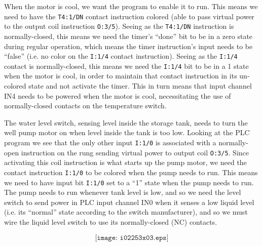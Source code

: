 When the motor is cool, we want the program to enable it to run.  This means we need to have the {\tt T4:1/DN} contact instruction colored (able to pass virtual power to the output coil instruction {\tt O:3/5}).  Seeing as the {\tt T4:1/DN} instruction is normally-closed, this means we need the timer's ``done'' bit to be in a zero state during regular operation, which means the timer instruction's input needs to be ``false'' (i.e. no color on the {\tt I:1/4} contact instruction).  Seeing as the {\tt I:1/4} contact is normally-closed, this means we need the {\tt I:1/4} bit to be in a 1 state when the motor is cool, in order to maintain that contact instruction in its un-colored state and not activate the timer.  This in turn means that input channel IN4 needs to be powered when the motor is cool, necessitating the use of normally-closed contacts on the temperature switch.

\vskip 10pt

The water level switch, sensing level inside the storage tank, needs to turn the well pump motor on when level inside the tank is too low.  Looking at the PLC program we see that the only other input {\tt I:1/0} is associated with a normally-open instruction on the rung sending virtual power to output coil {\tt O:3/5}.  Since activating this coil instruction is what starts up the pump motor, we need the contact instruction {\tt I:1/0} to be colored when the pump needs to run.  This means we need to have input bit {\tt I:1/0} set to a ``1'' state when the pump needs to run.  The pump needs to run whenever tank level is low, and so we need the level switch to send power in PLC input channel IN0 when it senses a low liquid level (i.e. its ``normal'' state according to the switch manufacturer), and so we must wire the liquid level switch to use its normally-closed (NC) contacts.

$$\texttt{[image: i02253x03.eps]}$$




